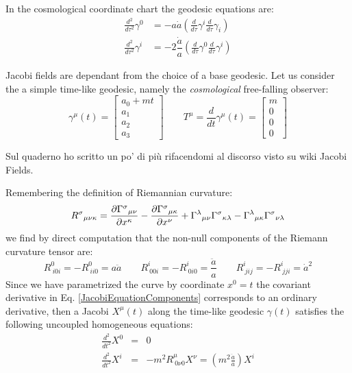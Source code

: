 \documentclass[Main]{subfiles}
\begin{document}
			In the cosmological coordinate chart the geodesic equations are:
			\begin{eqnarray}
				\frac{d^2}{d \tau^2} \gamma^0 &= - a \dot{a} \left( \frac{d}{d \tau} \gamma^i \frac{d}{d \tau}\gamma_i \right) \label{FRWGeo1}\\
				\frac{d^2}{d \tau^2} \gamma^i &= - 2 \dfrac{\dot{a}}{a} \left( \frac{d}{d \tau} \gamma^0 \frac{d}{d \tau}\gamma^i \right) 		\label{FRWGeo2}	
			\end{eqnarray}
			
			Jacobi fields are dependant from the choice of a base geodesic. 
			Let us consider the a simple time-like geodesic, namely the \emph{cosmological} free-falling observer:
			\begin{displaymath}
				\gamma^\mu (t) = \begin{bmatrix}  a_0 + m t \\  a_1 \\ a_2 \\ a_3  \end{bmatrix}
				\qquad
				T^\mu=\frac{d}{d t}\gamma^\mu(t)= \begin{bmatrix}  m \\  0 \\ 0 \\ 0  \end{bmatrix}
			\end{displaymath}
\ifToninus
	\begin{Warning}
		Sul quaderno ho scritto un po' di più rifacendomi al discorso visto su wiki Jacobi Fields.
	\end{Warning}
\fi
			Remembering the definition of Riemannian curvature:
			\begin{displaymath}
				{R^\sigma}_{\mu\nu\kappa} =
				  {\partial{\Gamma^\sigma}_{\mu\nu} \over \partial x^\kappa} -
				  {\partial{\Gamma^\sigma}_{\mu\kappa} \over \partial x^\nu} +
				  {\Gamma^\lambda}_{\mu\nu}{\Gamma^\sigma}_{\kappa\lambda} -
				  {\Gamma^\lambda}_{\mu\kappa}{\Gamma^\sigma}_{\nu\lambda}		
			\end{displaymath}			 
			we find by direct computation  that the non-null components of the Riemann curvature tensor are:
			\begin{equation}
				R^0_{\: i 0 i}= - R^{0}_{\: i i 0}= a \ddot{a} \qquad
				R^i_{\: 0 0 i}=-R^i_{\: 0 i 0}=	\dfrac{\ddot{a}}{a}\qquad
				R^i_{\: j i j} = - R^i_{\: j j i} = \dot{a}^2				
			\end{equation}
			Since we have parametrized the curve by coordinate $x^0 = t$ the covariant derivative in Eq. \ref{JacobiEquationComponents}  corresponds to an ordinary derivative, then a Jacobi $X^\mu(t)$ along the time-like geodesic $\gamma(t)$ satisfies the following uncoupled homogeneous equations:
			\begin{eqnarray}
				\frac{d^2}{d t^2} X^0  &=& 0 \label{FRWJacobi1}\\
				\frac{d^2}{d t^2} X^i &= &- m^2 R^{\mu}_{\: 0 \nu 0} X^\nu = \left( m^2 \frac{\ddot{a}}{a}\right) X^i 	\label{FRWJacobi2}	
			\end{eqnarray}			
			\vspace{2mm}
			
\end{document}
